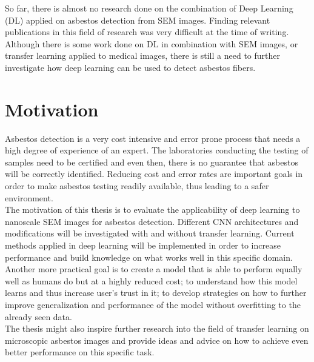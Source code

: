 So far, there is almost no research done on the combination of Deep Learning (DL) applied on asbestos detection from SEM images. Finding relevant publications in this field of research was very difficult at the time of writing. Although there is some work done on DL in combination with SEM images, or transfer learning applied to medical images, there is still a need to further investigate how deep learning can be used to detect asbestos fibers.\\



\section{Motivation}

Asbestos detection is a very cost intensive and error prone process that needs a high degree of experience of an expert. The laboratories conducting the testing of samples need to be certified and even then, there is no guarantee that asbestos will be correctly identified. Reducing cost and error rates are important goals in order to make asbestos testing readily available, thus leading to a safer environment.\\

The motivation of this thesis is to evaluate the applicability of deep learning to nanoscale SEM images for asbestos detection. Different CNN architectures and modifications will be investigated with and without transfer learning. Current methods applied in deep learning will be implemented in order to increase performance and build knowledge on what works well in this specific domain. \\

Another more practical goal is to create a model that is able to perform equally well as humans do but at a highly reduced cost; to understand how this model learns and thus increase user's trust in it; to develop strategies on how to further improve generalization and performance of the model without overfitting to the already seen data. \\

The thesis might also inspire further research into the field of transfer learning on microscopic asbestos images and provide ideas and advice on how to achieve even better performance on this specific task.\\


